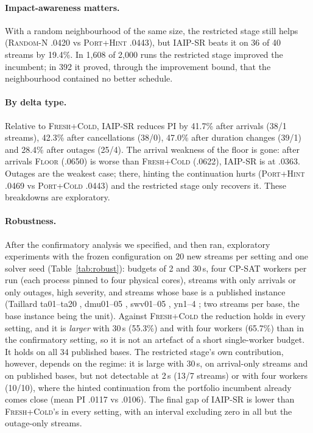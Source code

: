 \documentclass[letterpaper]{article} %
\newcommand{\mfloor}{\textsc{Floor}}
\newcommand{\miaip}{\textsc{IAIP-SR}}
\newcommand{\mfresh}{\textsc{Fresh+Cold}}
\newcommand{\mpc}{\textsc{Port+Cold}}
\newcommand{\mph}{\textsc{Port+Hint}}
\newcommand{\mrnd}{\textsc{Random-N}}
\begin{document}
\paragraph{Impact-awareness matters.} With a random neighbourhood of the same size, the restricted stage still helps (\mrnd{} .0420 vs \mph{} .0443), but \miaip{} beats it on 36 of 40 streams by 19.4\%. In 1{,}608 of 2{,}000 runs the restricted stage improved the incumbent; in 392 it proved, through the improvement bound, that the neighbourhood contained no better schedule.

\paragraph{By delta type.} Relative to \mfresh{}, \miaip{} reduces PI by 41.7\% after arrivals (38/1 streams), 42.3\% after cancellations (38/0), 47.0\% after duration changes (39/1) and 28.4\% after outages (25/4). The arrival weakness of the floor is gone: after arrivals \mfloor{} (.0650) is worse than \mfresh{} (.0622), \miaip{} is at .0363. Outages are the weakest case; there, hinting the continuation hurts (\mph{} .0469 vs \mpc{} .0443) and the restricted stage only recovers it. These breakdowns are exploratory.

\paragraph{Robustness.} After the confirmatory analysis we specified, and then ran, exploratory experiments with the frozen configuration on 20 new streams per setting and one solver seed (Table~\ref{tab:robust}): budgets of 2 and 30\,s, four CP-SAT workers per run (each process pinned to four physical cores), streams with only arrivals or only outages, high severity, and streams whose base is a published instance (Taillard ta01--ta20 \citep{taillard1993}, dmu01--05 \citep{demirkol1998}, swv01--05 \citep{storer1992}, yn1--4 \citep{yamada1992}; two streams per base, the base instance being the unit). Against \mfresh{} the reduction holds in every setting, and it is \emph{larger} with 30\,s (55.3\%) and with four workers (65.7\%) than in the confirmatory setting, so it is not an artefact of a short single-worker budget. It holds on all 34 published bases. The restricted stage's own contribution, however, depends on the regime: it is large with 30\,s, on arrival-only streams and on published bases, but not detectable at 2\,s (13/7 streams) or with four workers (10/10), where the hinted continuation from the portfolio incumbent already comes close (mean PI .0117 vs .0106). The final gap of \miaip{} is lower than \mfresh's in every setting, with an interval excluding zero in all but the outage-only streams.
\end{document}
